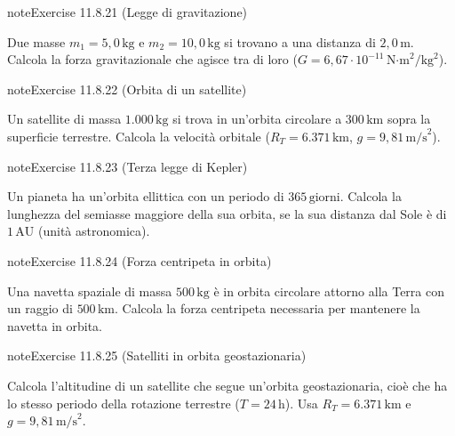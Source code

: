 \documentclass[letterpaper,10pt,italian]{jupyterBook}
\begin{document}
\begin{sphinxadmonition}{note}{Exercise 11.8.21 (Legge di gravitazione)}



\sphinxAtStartPar
Due masse \(m_1 = 5,0 \, \text{kg}\) e \(m_2 = 10,0 \, \text{kg}\) si trovano a una distanza di \(2,0 \, \text{m}\). Calcola la forza gravitazionale che agisce tra di loro (\(G = 6,67 \cdot 10^{-11} \, \text{N·m}^2/\text{kg}^2\)).
\end{sphinxadmonition}
 \label{exercise:ch/mechanics/dynamics-problems-exercise-21}

\begin{sphinxadmonition}{note}{Exercise 11.8.22 (Orbita di un satellite)}



\sphinxAtStartPar
Un satellite di massa \(1.000 \, \text{kg}\) si trova in un’orbita circolare a \(300 \, \text{km}\) sopra la superficie terrestre. Calcola la velocità orbitale (\(R_T = 6.371 \, \text{km}\), \(g = 9,81 \, \text{m/s}^2\)).
\end{sphinxadmonition}
 \label{exercise:ch/mechanics/dynamics-problems-exercise-22}

\begin{sphinxadmonition}{note}{Exercise 11.8.23 (Terza legge di Kepler)}



\sphinxAtStartPar
Un pianeta ha un’orbita ellittica con un periodo di \(365 \, \text{giorni}\). Calcola la lunghezza del semi\sphinxhyphen{}asse maggiore della sua orbita, se la sua distanza dal Sole è di \(1 \, \text{AU}\) (unità astronomica).
\end{sphinxadmonition}
 \label{exercise:ch/mechanics/dynamics-problems-exercise-23}

\begin{sphinxadmonition}{note}{Exercise 11.8.24 (Forza centripeta in orbita)}



\sphinxAtStartPar
Una navetta spaziale di massa \(500 \, \text{kg}\) è in orbita circolare attorno alla Terra con un raggio di \(500 \, \text{km}\). Calcola la forza centripeta necessaria per mantenere la navetta in orbita.
\end{sphinxadmonition}
 \label{exercise:ch/mechanics/dynamics-problems-exercise-24}

\begin{sphinxadmonition}{note}{Exercise 11.8.25 (Satelliti in orbita geostazionaria)}



\sphinxAtStartPar
Calcola l’altitudine di un satellite che segue un’orbita geostazionaria, cioè che ha lo stesso periodo della rotazione terrestre (\(T = 24 \, \text{h}\)). Usa \(R_T = 6.371 \, \text{km}\) e \(g = 9,81 \, \text{m/s}^2\).
\end{sphinxadmonition}
 \label{exercise:ch/mechanics/dynamics-problems-exercise-25}
\end{document}
